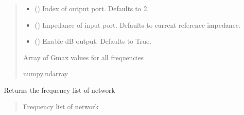 \documentclass[letterpaper,10pt,english]{sphinxmanual}
\begin{document}
\begin{fulllineitems}
\begin{fulllineitems}
\begin{quote}
\begin{description}
\begin{itemize}
\item {} 
\sphinxAtStartPar
{} (\sphinxstyleliteralemphasis{\sphinxupquote{, }}) \textendash{} Index of output port. Defaults to 2.

\item {} 
\sphinxAtStartPar
{} (\sphinxstyleliteralemphasis{\sphinxupquote{, }}) \textendash{} Impedance of input port. Defaults to current reference impedance.

\item {} 
\sphinxAtStartPar
{} (\sphinxstyleliteralemphasis{\sphinxupquote{, }}) \textendash{} Enable dB output. Defaults to True.

\end{itemize}

\sphinxAtStartPar
Array of Gmax values for all frequencies

\sphinxAtStartPar
numpy.ndarray

\end{description}\end{quote}

\end{fulllineitems}


\begin{fulllineitems}
\label{\detokenize{touchstone:touchstone.spfile.get_formulation}}
\pysigstartsignatures
{}
\pysigstopsignatures
\end{fulllineitems}


\begin{fulllineitems}
\label{\detokenize{touchstone:touchstone.spfile.get_frequency_list}}
\pysigstartsignatures
{}
\pysigstopsignatures
\sphinxAtStartPar
Returns the frequency list of network
\begin{quote}\begin{description}
\sphinxAtStartPar
Frequency list of network


\end{description}
\end{quote}
\end{fulllineitems}
\end{fulllineitems}
\end{document}
